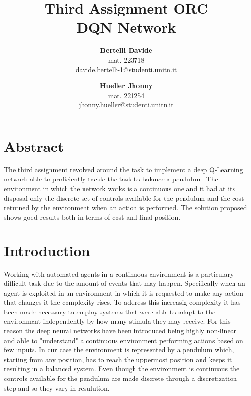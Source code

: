 \documentclass[twocolumn, a4paper]{article}
\begin{document}
\title{
	   \LARGE\textbf{Third Assignment ORC\\DQN Network}
	   \vspace{1cm}
	  }
\author{
		\textbf{Bertelli Davide} \\
		mat. 223718 \\
		davide.bertelli-1@studenti.unitn.it
		\and
		\textbf{Hueller Jhonny} \\
		mat. 221254\\
		jhonny.hueller@studenti.unitn.it
	   }
\date{}
\maketitle

\section{Abstract}
The third assignment revolved around the task to implement a deep Q-Learning
network able to proficiently tackle the task to balance a pendulum.
The environment in which the network works is a continuous one and it had at
its disposal only the discrete set of controls available for the pendulum and
the cost returned by the environment when an action is performed.
The solution proposed shows good results both in terms of cost and final
position.

\section{Introduction}
Working with automated agents in a continuous environment is a particulary
difficult task due to the amount of events that may happen. Specifically
when an agent is exploited in an environment in which it is requested to
make any action that changes it the complexity rises. To address this increasig
complexity it has been made necessary to employ systems that were able to
adapt to the environment independently by how many stimula they may receive.
For this reason the deep neural networks have been introduced being highly
non-linear and able to "understand" a continuous environment performing
actions based on few inputs.
In our case the environment is represented by a pendulum which, starting from
any position, has to reach the uppermost position and keeps it resulting in a
balanced system. Even though the environment is continuous the controls
available for the pendulum are made discrete through a discretization step
and so they vary in resulution.
\end{document}
